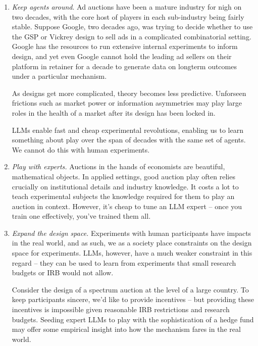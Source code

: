 \documentclass{article} %
\begin{document}
\begin{enumerate}
    \item \textit{Keep agents around}. Ad auctions have been a mature industry for nigh on two decades, with the core host of players in each sub-industry being fairly stable. 
    Suppose Google, two decades ago, was trying to decide whether to use the GSP or Vickrey design to sell ads in a complicated combinatorial setting. 
    Google has the resources to run extensive internal experiments to inform design, and yet even Google cannot hold the leading ad sellers on their platform in retainer for a decade to generate data on longterm outcomes under a particular mechanism.

    As designs get more complicated, theory becomes less predictive. 
    Unforseen frictions such as market power or information asymmetries may play large roles in the health of a market after its design has been locked in.

    LLMs enable fast and cheap experimental revolutions, enabling us to learn something about play over the span of decades with the same set of agents. 
    We cannot do this with human experiments.

    \item \textit{Play with experts.} Auctions in the hands of economists are beautiful, mathematical objects. 
    In applied settings, good auction play often relies crucially on institutional details and industry knowledge. 
    It costs a lot to teach experimental subjects the knowledge required for them to play an auction in context. 
    However, it's cheap to tune an LLM expert -- once you train one effectively, you've trained them all.

    \item \textit{Expand the design space.} Experiments with human participants have impacts in the real world, and as such, we as a society place constraints on the design space for experiments. 
    LLMs, however, have a much weaker constraint in this regard -- they can be used to learn from experiments that small research budgets or IRB would not allow. 

    Consider the design of a spectrum auction at the level of a large country. 
    To keep participants sincere, we'd like to provide incentives -- but providing these incentives is impossible given reasonable IRB restrictions and research budgets.
    Seeding expert LLMs to play with the sophistication of a hedge fund may offer some empirical insight into how the mechanism fares in the real world.


\end{enumerate}
\end{document}

